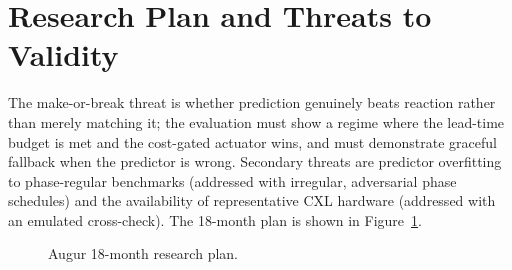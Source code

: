 \documentclass[sigconf,nonacm]{acmart}
\begin{document}
\section{Research Plan and Threats to Validity}
The make-or-break threat is whether prediction genuinely beats reaction rather
than merely matching it; the evaluation must show a regime where the lead-time
budget is met and the cost-gated actuator wins, and must demonstrate graceful
fallback when the predictor is wrong. Secondary threats are predictor overfitting
to phase-regular benchmarks (addressed with irregular, adversarial phase
schedules) and the availability of representative CXL hardware (addressed with an
emulated cross-check). The 18-month plan is shown in Figure~\ref{fig:gantt}.

\begin{figure}[t]
\centering
{}
\caption{Augur 18-month research plan.}
\label{fig:gantt}
\end{figure}
\end{document}

